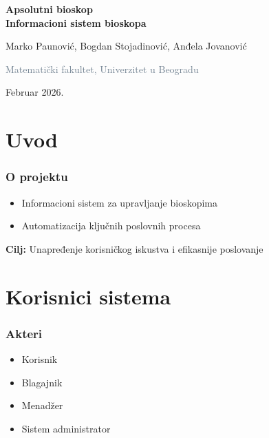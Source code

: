\documentclass{beamer}
\begin{document}
\begin{frame}[plain]

\vspace{20pt}
\centering
{\huge\bfseries\textcolor{darkcharcoal}{Apsolutni bioskop}\\[5pt]
\Large\textcolor{darkcharcoal}{Informacioni sistem bioskopa}}

\vspace{25pt}
{\small\textcolor{darkcharcoal}{Marko Paunović, Bogdan Stojadinović, Anđela Jovanović}}

\vspace{10pt}
{\footnotesize\textcolor{slategray}{Matematički fakultet, Univerzitet u Beogradu}}

\vspace{15pt}
{\small\textcolor{accent}{Februar 2026.}}
\end{frame}

\section{Uvod}

\begin{frame}
\frametitle{O projektu}
\begin{itemize}
\item Informacioni sistem za upravljanje bioskopima
\item Automatizacija ključnih poslovnih procesa
\end{itemize}

\vspace{15pt}
\textbf{Cilj:} Unapređenje korisničkog iskustva i efikasnije poslovanje
\end{frame}

\section{Korisnici sistema}

\begin{frame}
\frametitle{Akteri}
\begin{itemize}
\item Korisnik
\item Blagajnik
\item Menadžer
\item Sistem administrator
\end{itemize}
\end{frame}
\end{document}
